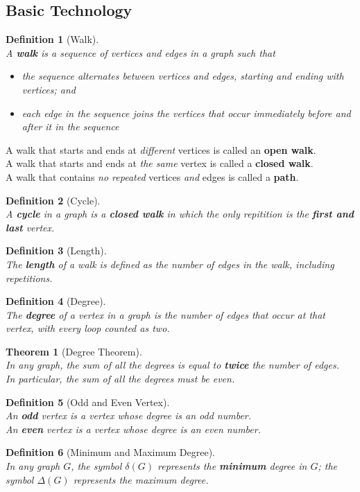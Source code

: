 \documentclass[12pt]{article}
\newtheorem{definition}{Definition}[section]
\newtheorem{theorem}{Theorem}[section]
\theoremstyle{definition}
\begin{document}
\subsection{Basic Technology}
\begin{definition}[Walk]
\hfill\\\normalfont A \textbf{walk} is a sequence of vertices and edges in a graph such that
\begin{itemize}
  \item the sequence alternates between vertices and edges, starting and ending with vertices; and
  \item each edge in the sequence joins the vertices that occur immediately before and after it in the sequence
\end{itemize}
\end{definition}
A walk that starts and ends at \textit{different} vertices is called an \textbf{open walk}.\\
A walk that starts and ends at \textit{the same} vertex is called a \textbf{closed walk}.\\
A walk that contains \textit{no repeated} vertices \textit{and} edges is called a \textbf{path}.
\begin{definition}[Cycle]
\hfill\\\normalfont A \textbf{cycle} in a graph is a \textbf{closed walk} in which the only repitition is the \textbf{first and last} vertex.
\end{definition} 
\begin{definition}[Length]
\hfill\\\normalfont The \textbf{length} of a walk is defined as the number of edges in the walk, including repetitions.
\end{definition}
\begin{definition}[Degree]
\hfill\\\normalfont The \textbf{degree} of a vertex in a graph is the number of edges that occur at that vertex, with every \textit{loop counted as two}.
\end{definition}
\begin{theorem}[Degree Theorem]
\hfill\\\normalfont In any graph, the sum of all the degrees is equal to \textbf{twice} the number of edges.\\In particular, the sum of all the degrees must be even.
\end{theorem}
\begin{definition}[Odd and Even Vertex]
\hfill\\\normalfont An \textbf{odd} vertex is a vertex whose degree is an odd number.\\
An \textbf{even} vertex is a vertex whose degree is an even number.
\end{definition}
\begin{definition}[Minimum and Maximum Degree]
\hfill\\\normalfont In any graph $G$, the symbol $\delta(G)$ represents the \textbf{minimum} degree in $G$; the symbol $\Delta(G)$ represents the maximum degree.
\end{definition}
\end{document}
